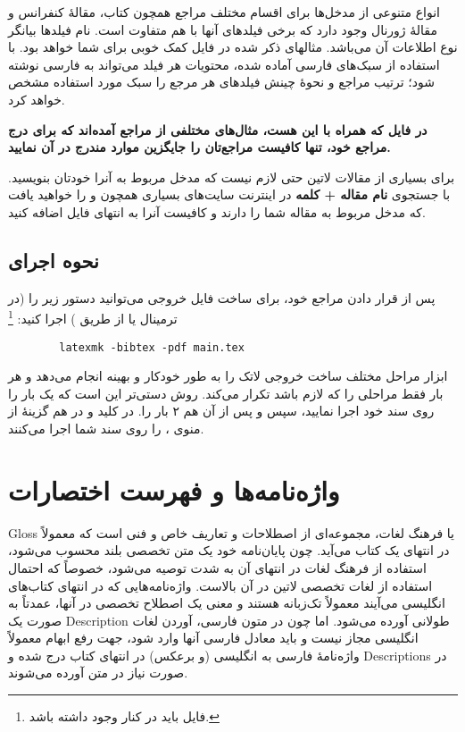 انواع متنوعی از مدخل‌ها برای اقسام مختلف مراجع همچون کتاب، مقالهٔ کنفرانس و مقالهٔ ژورنال وجود دارد که برخی فیلدهای آنها با هم متفاوت است. 
نام فیلدها بیانگر نوع اطلاعات آن می‌باشد. مثالهای ذکر شده در فایل  کمک خوبی برای شما خواهد بود. 
با استفاده از سبک‌های فارسی آماده شده، محتویات هر فیلد می‌تواند به فارسی نوشته شود؛ ترتیب مراجع و نحوهٔ چینش فیلدهای هر مرجع را سبک مورد استفاده  مشخص خواهد کرد.

\textbf{در فایل 
 که همراه با این \پ هست، مثال‌های مختلفی از مراجع آمده‌اند که برای درج مراجع خود، تنها کافیست مراجع‌تان را جایگزین موارد مندرج در آن نمایید.
}

برای بسیاری از مقالات لاتین حتی لازم نیست که مدخل مربوط به آنرا خودتان بنویسید. با جستجوی 
\textbf{نام مقاله + کلمه
}
در اینترنت سایت‌های بسیاری همچون
 و 
را خواهید یافت که مدخل
مربوط به مقاله شما را دارند و کافیست آنرا به انتهای فایل
اضافه کنید.

\subsection{نحوه اجرای \texorpdfstring{}{Bib\TeX}}
پس از قرار دادن مراجع خود، برای ساخت فایل خروجی می‌توانید دستور زیر را (در ترمینال یا از طریق ) اجرا کنید:%
\footnote{فایل  باید در کنار  وجود داشته باشد.}

\singlespacing
\begin{LTR}
	\begin{verbatim}
		latexmk -bibtex -pdf main.tex
	\end{verbatim}
\end{LTR}
\doublespacing
ابزار  مراحل مختلف ساخت خروجی لاتک را به طور خودکار و بهینه انجام می‌دهد و هر بار فقط مراحلی را که لازم باشد تکرار می‌کند.
روش دستی‌تر این است که یک بار  را روی سند خود اجرا نمایید، سپس  و پس از آن هم ۲ بار  را. در  کلید  و در  هم گزینهٔ  از منوی ،  را روی سند شما اجرا می‌کنند.

\section{واژه‌نامه‌ها و فهرست اختصارات}
\gls{Gloss}
یا فرهنگ لغات، مجموعه‌ای از اصطلاحات و تعاریف خاص و فنی است که معمولاً در انتهای یک کتاب می‌آید. چون پایان‌نامه خود یک متن تخصصی بلند محسوب می‌شود، استفاده از فرهنگ لغات در انتهای آن به شدت توصیه می‌شود، خصوصاً که احتمال استفاده از لغات تخصصی لاتین در آن بالاست.
واژه‌نامه‌هایی که در انتهای کتاب‌های انگلیسی می‌آیند معمولاً تک‌زبانه هستند و معنی یک اصطلاح تخصصی در آنها، عمدتاً به صورت یک
\gls{Description}
طولانی آورده می‌شود. اما چون در متون فارسی، آوردن لغات انگلیسی مجاز نیست و باید معادل فارسی آنها وارد شود، جهت رفع ابهام معمولاً واژه‌نامهٔ فارسی به انگلیسی (و برعکس) در انتهای کتاب درج شده و  
\glspl{Description}
در صورت نیاز در متن آورده می‌شوند.

